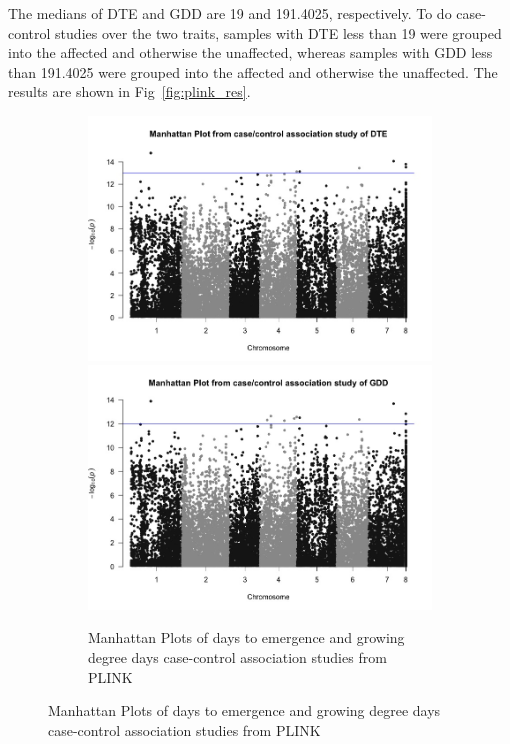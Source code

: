 \documentclass{article}
\begin{document}
The medians of DTE and GDD are 19 and 191.4025, respectively. To do case-control studies over the two traits, samples with DTE less than 19 were grouped into the affected and otherwise the unaffected, whereas samples with GDD less than 191.4025 were grouped into the affected and otherwise the unaffected. The results are shown in Fig~\ref{fig:plink_res}.

\begin{figure}[!htb]
\centering

\begin{subfigure}{\textwidth}
\centering
\includegraphics[scale=.25]{mplot_cc_dte.jpeg}
\includegraphics[scale=.25]{mplot_cc_gdd.jpeg}
\caption{Manhattan Plots of days to emergence and growing degree days case-control association studies from PLINK}
\label{fig:plink_sub1}
\end{subfigure}


\end{figure}
\end{document}
